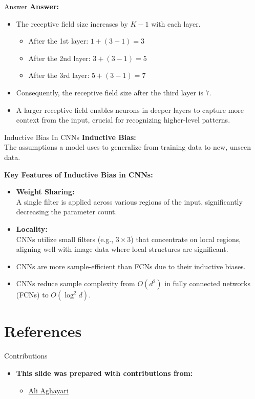 \documentclass[default, aspectratio=169]{beamer}
\begin{document}
	\begin{frame}{Answer}
		\textbf{Answer:}
		\begin{itemize}
			\item The receptive field size increases by \( K - 1 \) with each layer.
			\begin{itemize}
				\item After the 1st layer: \( 1 + (3 - 1) = 3 \)
				\item After the 2nd layer: \( 3 + (3 - 1) = 5 \)
				\item After the 3rd layer: \( 5 + (3 - 1) = 7 \)
			\end{itemize}
			\item Consequently, the receptive field size after the third layer is \( 7 \).
			\item A larger receptive field enables neurons in deeper layers to capture more context from the input, crucial for recognizing higher-level patterns.
		\end{itemize}
	\end{frame}
	\begin{frame}{Inductive Bias In CNNs}
		\textbf{Inductive Bias:} \\
		The assumptions a model uses to generalize from training data to new, unseen data.
		
		\bigskip
		\textbf{Key Features of Inductive Bias in CNNs:}
		\begin{itemize}
			\item \textbf{Weight Sharing:} \\
			A single filter is applied across various regions of the input, significantly decreasing the parameter count.
			
			\item \textbf{Locality:} \\
			CNNs utilize small filters (e.g., $3 \times 3$) that concentrate on local regions, aligning well with image data where local structures are significant.
			
			\item CNNs are more sample-efficient than FCNs due to their inductive biases.
			\item CNNs reduce sample complexity from $O(d^2)$ in fully connected networks (FCNs) to $O(\log^2 d)$.
		\end{itemize}
	\end{frame}
	
	
	\section{References}
	\begin{frame}{Contributions}
		\begin{itemize}
			\item \textbf{This slide was prepared with contributions from:}
			\begin{itemize}
				\setlength{\itemsep}{10pt}
				\item \href{https://github.com/Ali0281}{Ali Aghayari}
			\end{itemize}
		\end{itemize}
		
	\end{frame}
	
	\begin{frame}[allowframebreaks]
		
		
		\nocite{*}
	\end{frame}
	
	
\end{document}
